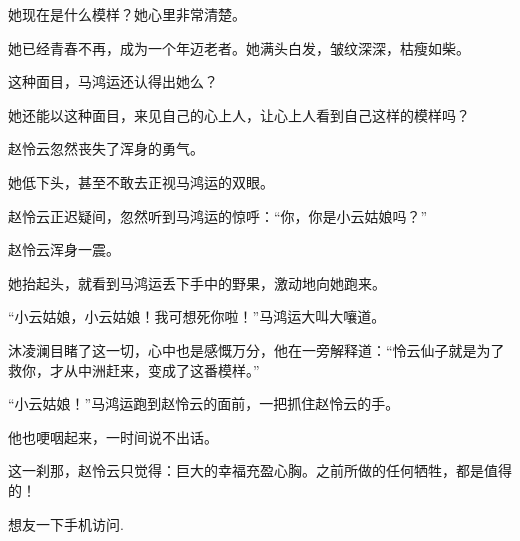\begin{this_body}
她现在是什么模样？她心里非常清楚。

她已经青春不再，成为一个年迈老者。她满头白发，皱纹深深，枯瘦如柴。

这种面目，马鸿运还认得出她么？

她还能以这种面目，来见自己的心上人，让心上人看到自己这样的模样吗？

赵怜云忽然丧失了浑身的勇气。

她低下头，甚至不敢去正视马鸿运的双眼。

赵怜云正迟疑间，忽然听到马鸿运的惊呼：“你，你是小云姑娘吗？”

赵怜云浑身一震。

她抬起头，就看到马鸿运丢下手中的野果，激动地向她跑来。

“小云姑娘，小云姑娘！我可想死你啦！”马鸿运大叫大嚷道。

沐凌澜目睹了这一切，心中也是感慨万分，他在一旁解释道：“怜云仙子就是为了救你，才从中洲赶来，变成了这番模样。”

“小云姑娘！”马鸿运跑到赵怜云的面前，一把抓住赵怜云的手。

他也哽咽起来，一时间说不出话。

这一刹那，赵怜云只觉得：巨大的幸福充盈心胸。之前所做的任何牺牲，都是值得的！

想友一下手机访问.

\end{this_body}

